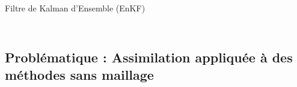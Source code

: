 \documentclass[aspectratio=169]{beamer} %
\begin{document}
\begin{frame}{Filtre de Kalman d'Ensemble (EnKF)}
\begin{columns}[t]
\begin{column}{0.4\textwidth}
\begin{figure}[t]
            \end{figure}
        \end{column}
    \end{columns}
\end{frame}

\subsection{Problématique : Assimilation appliquée à des méthodes sans maillage}
\end{document}
